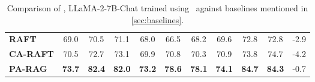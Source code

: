 \begin{table*}[]
{\begin{tabular}{@{}lcccccccccc@{}}
\textbf{RAFT} &
  69.0 &
  70.5 &
  71.1 &
  68.0 &
  66.5 &
  68.2 &
  69.6 &
  72.8 &
  \multicolumn{1}{c|}{72.8} &
  -2.9 \\
\textbf{CA-RAFT} &
  70.5 &
  72.7 &
  73.1 &
  69.9 &
  70.8 &
  70.3 &
  70.9 &
  73.8 &
  \multicolumn{1}{c|}{74.7} &
  -4.2 \\
\textbf{PA-RAG} &
  \textbf{73.7} &
  \textbf{82.4} &
  \textbf{82.0} &
  \textbf{73.2} &
  \textbf{78.6} &
  \textbf{78.1} &
  \textbf{74.1} &
  \textbf{84.7} &
  \multicolumn{1}{c|}{\textbf{84.3}} &
  -0.7 \\ \bottomrule
\end{tabular}
}
\caption{Comparison of , LLaMA-2-7B-Chat trained using \ourmethodshort\ against baselines mentioned in \ref{sec:baselines}.}
\label{tab:main_table_llama7b}
\end{table*}